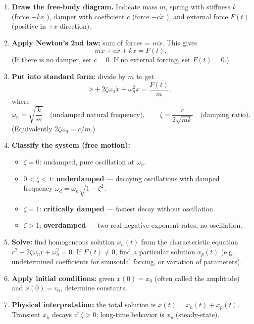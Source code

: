     \begin{enumerate}
      \item \textbf{Draw the free-body diagram.} Indicate mass \(m\), spring with stiffness \(k\) (force \( -kx\) ), damper with coefficient \(c\) (force \( -c\dot x\) ), and external force \(F(t)\) (positive in +\(x\) direction).
      \item \textbf{Apply Newton's 2nd law:} sum of forces = \(m\ddot x\). This gives
        \[
          m\ddot x + c\dot x + kx = F(t).
        \]
        (If there is no damper, set \(c=0\). If no external forcing, set \(F(t)=0\).)
      \item \textbf{Put into standard form:} divide by \(m\) to get
        \[
          \ddot x + 2\zeta\omega_n \dot x + \omega_n^2 x = \frac{F(t)}{m},
        \]
        where
        \[
          \omega_n = \sqrt{\frac{k}{m}}\quad\text{(undamped natural frequency)},\qquad
          \zeta = \frac{c}{2\sqrt{mk}}\quad\text{(damping ratio)}.
        \]
        (Equivalently \(2\zeta\omega_n = c/m\).)
      \item \textbf{Classify the system (free motion):}
        \begin{itemize}
          \item \(\zeta=0\): undamped, pure oscillation at \(\omega_n\).
          \item \(0<\zeta<1\): \textbf{underdamped} — decaying oscillations with damped frequency \(\omega_d=\omega_n\sqrt{1-\zeta^2}\).
          \item \(\zeta=1\): \textbf{critically damped} — fastest decay without oscillation.
          \item \(\zeta>1\): \textbf{overdamped} — two real negative exponent rates, no oscillation.
        \end{itemize}
      \item \textbf{Solve:} find homogeneous solution \(x_h(t)\) from the characteristic equation \(r^2 + 2\zeta\omega_n r + \omega_n^2=0\). If \(F(t)\ne0\), find a particular solution \(x_p(t)\) (e.g. undetermined coefficients for sinusoidal forcing, or variation of parameters).
      \item \textbf{Apply initial conditions:} given \(x(0)=x_0\) (often called the amplitude) and \(\dot x(0)=v_0\), determine constants.
      \item \textbf{Physical interpretation:} the total solution is \(x(t)=x_h(t)+x_p(t)\). Transient \(x_h\) decays if \(\zeta>0\); long-time behavior is \(x_p\) (steady-state).
    \end{enumerate}


